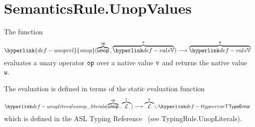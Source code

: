 \documentclass{book}
\newcommand\unoprel[0]{\hyperlink{def-unoprel}{\textfunc{unop}}}
\newcommand\vl[0]{\texttt{l}}
\newcommand\vw[0]{\texttt{w}}
\begin{document}
\section{SemanticsRule.UnopValues \label{sec:SemanticsRule.UnopValues}}
\hypertarget{def-unoprel}{}
The function
\[
  \unoprel(\overname{\unop}{\op} \aslsep \overname{\vals}{\vv}) \aslto \overname{\vals}{\vw}
\]
evaluates a unary operator $\texttt{op}$ over a native value $\texttt{v}$ and returns the native value $\vw$.

The evaluation is defined in terms of the static evaluation function
\hypertarget{def-unopliterals}{}
\[
  \unopliterals(\overname{\unop}{\op} \aslsep \overname{\literals}{\vl}) \aslto
  \overname{\literals}{\vr} \cup \TTypeError
\]
which is defined in the ASL Typing Reference~\cite{ASLTypingReference} (see TypingRule.UnopLiterals).
\end{document}
